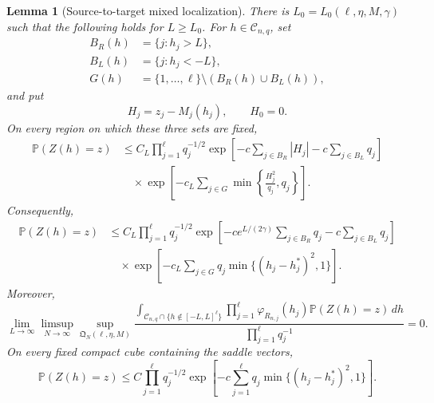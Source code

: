 \documentclass[11pt]{article}
\newtheorem{lemma}[theorem]{Lemma}
\theoremstyle{remark}
\newcommand{\Pp}{\mathbb P}
\newcommand{\dd}{\,d}
\begin{document}
\begin{lemma}[Source-to-target mixed localization]
\label{lem:endpoint-point-localization}
There is $L_0=L_0(\ell,\eta,M,\gamma)$ such that the following holds for
$L\ge L_0$.  For $h\in\mathscr C_{n,q}$, set
\[
\begin{aligned}
        B_R(h)&=\{j:h_j>L\},\\
        B_L(h)&=\{j:h_j<-L\},\\
        G(h)&=\{1,\ldots,\ell\}\setminus(B_R(h)\cup B_L(h)),
\end{aligned}
\]
and put
\[
        H_j=z_j-M_j(h_j),\qquad H_0=0.
\]
On every region on which these three sets are fixed,
\[
\begin{aligned}
\Pp(Z(h)=z)
&\le C_L\prod_{j=1}^\ell q_j^{-1/2}
\exp\left[-c\sum_{j\in B_R}|H_j|
           -c\sum_{j\in B_L}q_j\right]\\
&\quad\times
\exp\left[-c_L\sum_{j\in G}
\min\left\{\frac{H_j^2}{q_j},q_j\right\}\right].
\end{aligned}
\tag{10.15}\label{eq:endpoint-point-mixed-bound}
\]
Consequently,
\[
\begin{aligned}
\Pp(Z(h)=z)
&\le C_L\prod_{j=1}^\ell q_j^{-1/2}
\exp\left[-ce^{L/(2\gamma)}\sum_{j\in B_R}q_j
           -c\sum_{j\in B_L}q_j\right]\\
&\quad\times
\exp\left[-c_L\sum_{j\in G}
q_j\min\{(h_j-h_j^*)^2,1\}\right].
\end{aligned}
\tag{10.16}\label{eq:endpoint-point-scaled-bound}
\]
Moreover,
\[
\lim_{L\to\infty}\limsup_{N\to\infty}
\sup_{\mathfrak Q_N(\ell,\eta,M)}
\frac{
\displaystyle
\int_{\mathscr C_{n,q}\cap\{h\notin[-L,L]^\ell\}}
\prod_{j=1}^\ell\varphi_{R_{n,j}}(h_j)
\Pp(Z(h)=z)\dd h
}{\prod_{j=1}^\ell q_j^{-1}}=0.
\tag{10.17}\label{eq:endpoint-point-noncompact}
\]
On every fixed compact cube containing the saddle vectors,
\[
\Pp(Z(h)=z)
\le C\prod_{j=1}^\ell q_j^{-1/2}
\exp\left[-c\sum_{j=1}^\ell
q_j\min\{(h_j-h_j^*)^2,1\}\right].
\tag{10.18}\label{eq:endpoint-point-compact-localization}
\]
\end{lemma}
\end{document}
